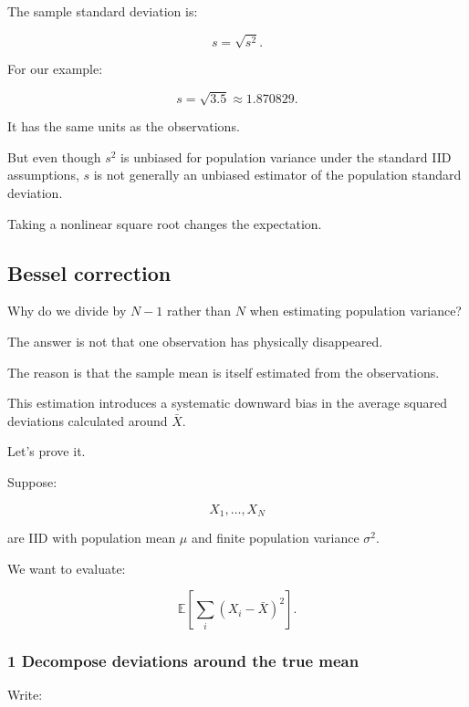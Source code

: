 \hypertarget{02-foundations-ii-ch030-sample-standard-deviation}{}

The sample standard deviation is:

\[
 \boxed{s=\sqrt{s^2}}.
\]

For our example:

\[
 s=\sqrt{3.5}\approx1.870829.
\]

It has the same units as the observations.

But even though \(s^2\) is unbiased for population variance under the standard IID assumptions, \(s\) is not generally an unbiased estimator of the population standard deviation.

Taking a nonlinear square root changes the expectation.

\subsection{Bessel correction}\label{02-foundations-ii-ch030-bessel-correction}

\hypertarget{02-foundations-ii-ch030-bessel-correction}{}

Why do we divide by \(N-1\) rather than \(N\) when estimating population variance?

The answer is not that one observation has physically disappeared.

The reason is that the sample mean is itself estimated from the observations.

This estimation introduces a systematic downward bias in the average squared deviations calculated around \(\bar X\).

Let's prove it.

Suppose:

\[
 X_1,\ldots,X_N
\]

are IID with population mean \(\mu\) and finite population variance \(\sigma^2\).

We want to evaluate:

\[
 \mathbb E\left[ \sum_i(X_i-\bar X)^2 \right].
\]

\subsubsection{1 Decompose deviations around the true mean}\label{02-foundations-ii-ch030-decompose-deviations-around-the-true-mean}

\hypertarget{02-foundations-ii-ch030-decompose-deviations-around-the-true-mean}{}

Write:

